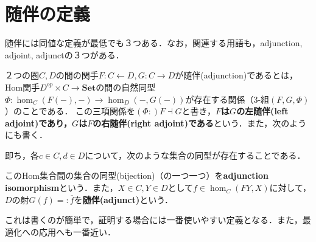 \documentclass[uplatex, 12pt, dvipdfmx]{jsreport}
\begin{document}
\section{随伴の定義}
随伴には同値な定義が最低でも３つある．なお，関連する用語も，adjunction, adjoint, adjunctの３つがある．

\begin{shadebox}\begin{definition}[定まるHom関手の同型としての定義]\rm{}\label{adjoint-1}
    ２つの圏$C,D$の間の関手$F:C\leftarrow D, G:C\rightarrow D$が随伴(adjunction)であるとは，Hom関手$D^{op}\times C\to\mathbf{Set}$の間の自然同型$\Phi :\hom_C(F(-),-)\to\hom_D(-,G(-))$が存在する関係（3-組$(F,G,\Phi)$）のことである．
    この三項関係を$(\Phi :)F\dashv G$と書き，\textbf{$F$は$G$の左随伴(left adjoint)であり，$G$は$F$の右随伴(right adjoint)である}という．また，次のようにも書く．
    \begin{center}\end{center}
    即ち，各$c\in C, d\in D$について，次のような集合の同型が存在することである．
    \begin{center}\end{center}

    このHom集合間の集合の同型(bijection)（の一つ一つ）を\textbf{adjunction isomorphism}という．また，$X\in C, Y\in D$として$f\in\hom_C(FY,X)$に対して，$D$の射$G(f)=:\overline{f}$を\textbf{随伴(adjunct)}という．
\end{definition}\end{shadebox}

\begin{definition}[普遍射を用いた定義]
    
\end{definition}
これは書くのが簡単で，証明する場合には一番使いやすい定義となる．また，最適化への応用へも一番近い．

\begin{definition}
    
\end{definition}
\end{document}
